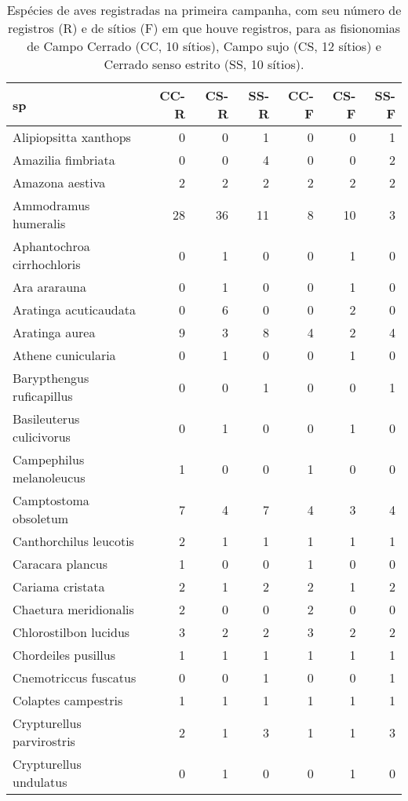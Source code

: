 \begin{table}%
  \label{tab:aves1}
  \caption{Espécies de aves registradas na primeira campanha, com
    seu número de registros (R) e de sítios (F) em que houve registros, 
    para as fisionomias de Campo Cerrado (CC, 10 sítios), Campo sujo (CS, 12 sítios) 
    e Cerrado senso estrito (SS, 10 sítios).}
  \begin{tabular}{lrrrrrr}
    \hline
    sp & CC-R & CS-R & SS-R &  CC-F & CS-F & SS-F \\
    \hline
    Alipiopsitta xanthops & 0 & 0 & 1 & 0 & 0 & 1 \\ 
    Amazilia fimbriata & 0 & 0 & 4 & 0 & 0 & 2 \\ 
    Amazona aestiva & 2 & 2 & 2 & 2 & 2 & 2 \\ 
    Ammodramus humeralis & 28 & 36 & 11 & 8 & 10 & 3 \\ 
    Aphantochroa cirrhochloris & 0 & 1 & 0 & 0 & 1 & 0 \\ 
    Ara ararauna & 0 & 1 & 0 & 0 & 1 & 0 \\ 
    Aratinga acuticaudata & 0 & 6 & 0 & 0 & 2 & 0 \\ 
    Aratinga aurea & 9 & 3 & 8 & 4 & 2 & 4 \\ 
    Athene cunicularia & 0 & 1 & 0 & 0 & 1 & 0 \\ 
    Barypthengus ruficapillus & 0 & 0 & 1 & 0 & 0 & 1 \\ 
    Basileuterus culicivorus & 0 & 1 & 0 & 0 & 1 & 0 \\ 
    Campephilus melanoleucus & 1 & 0 & 0 & 1 & 0 & 0 \\ 
    Camptostoma obsoletum & 7 & 4 & 7 & 4 & 3 & 4 \\ 
    Canthorchilus leucotis & 2 & 1 & 1 & 1 & 1 & 1 \\ 
    Caracara plancus & 1 & 0 & 0 & 1 & 0 & 0 \\ 
    Cariama cristata & 2 & 1 & 2 & 2 & 1 & 2 \\ 
    Chaetura meridionalis & 2 & 0 & 0 & 2 & 0 & 0 \\ 
    Chlorostilbon lucidus & 3 & 2 & 2 & 3 & 2 & 2 \\ 
    Chordeiles pusillus & 1 & 1 & 1 & 1 & 1 & 1 \\ 
    Cnemotriccus fuscatus & 0 & 0 & 1 & 0 & 0 & 1 \\ 
    Colaptes campestris & 1 & 1 & 1 & 1 & 1 & 1 \\ 
    Crypturellus parvirostris & 2 & 1 & 3 & 1 & 1 & 3 \\ 
    Crypturellus undulatus & 0 & 1 & 0 & 0 & 1 & 0 \\ 

\end{tabular}
\end{table}

